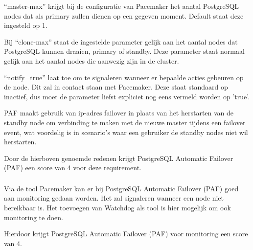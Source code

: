 “master-max” krijgt bij de configuratie van Pacemaker het aantal PostgreSQL nodes dat als primary zullen dienen op een gegeven moment. Default staat deze ingesteld op 1.

Bij “clone-max” staat de ingestelde parameter gelijk aan het aantal nodes dat PostgreSQL kunnen draaien, primary of standby. Deze parameter staat normaal gelijk aan het aantal nodes die aanwezig zijn in de cluster.

“notify=true” laat toe om te signaleren wanneer er bepaalde acties gebeuren op de node. Dit zal in contact staan met Pacemaker. Deze staat standaard op inactief, dus moet de parameter liefst expliciet nog eens vermeld worden op 'true'.

PAF maakt gebruik van ip-adres failover in plaats van het herstarten van de standby node om verbinding te maken met de nieuwe master tijdens een failover event, wat voordelig is in scenario's waar een gebruiker de standby nodes niet wil herstarten.

Door de hierboven genoemde redenen krijgt PostgreSQL Automatic Failover (PAF) een score van 4 voor deze requirement.

\subsubsection{}
\label{subsubsec:Ondersteuning van monitoring}

Via de tool Pacemaker kan er bij PostgreSQL Automatic Failover (PAF) goed aan monitoring gedaan worden. Het zal signaleren wanneer een node niet bereikbaar is.
Het toevoegen van Watchdog als tool is hier mogelijk om ook monitoring te doen.

Hierdoor krijgt PostgreSQL Automatic Failover (PAF) voor monitoring een score van 4.

\subsection{}
\label{subsec:Should have}


\subsubsection{}
\label{subsubsec:Actieve ondersteuning in 2020-2021}

